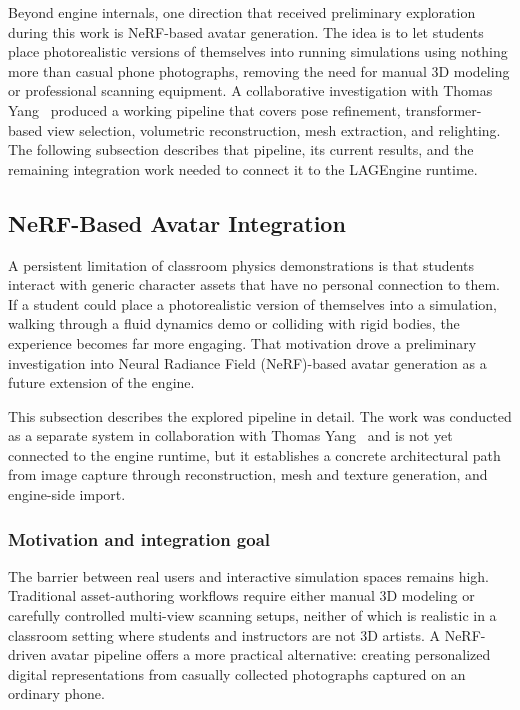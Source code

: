 \documentclass[9pt,openany]{extbook}
\begin{document}
Beyond engine internals, one direction that received preliminary exploration during this work is NeRF-based avatar generation. The idea is to let students place photorealistic versions of themselves into running simulations using nothing more than casual phone photographs, removing the need for manual 3D modeling or professional scanning equipment. A collaborative investigation with Thomas Yang~\cite{ghosh2025neural} produced a working pipeline that covers pose refinement, transformer-based view selection, volumetric reconstruction, mesh extraction, and relighting. The following subsection describes that pipeline, its current results, and the remaining integration work needed to connect it to the LAGEngine runtime.

\subsection{NeRF-Based Avatar Integration}

A persistent limitation of classroom physics demonstrations is that students interact with generic character assets that have no personal connection to them. If a student could place a photorealistic version of themselves into a simulation, walking through a fluid dynamics demo or colliding with rigid bodies, the experience becomes far more engaging. That motivation drove a preliminary investigation into Neural Radiance Field (NeRF)-based avatar generation as a future extension of the engine.

This subsection describes the explored pipeline in detail. The work was conducted as a separate system in collaboration with Thomas Yang~\cite{ghosh2025neural} and is not yet connected to the engine runtime, but it establishes a concrete architectural path from image capture through reconstruction, mesh and texture generation, and engine-side import.


\subsubsection{Motivation and integration goal}

The barrier between real users and interactive simulation spaces remains high. Traditional asset-authoring workflows require either manual 3D modeling or carefully controlled multi-view scanning setups, neither of which is realistic in a classroom setting where students and instructors are not 3D artists. A NeRF-driven avatar pipeline offers a more practical alternative: creating personalized digital representations from casually collected photographs captured on an ordinary phone.
\end{document}
